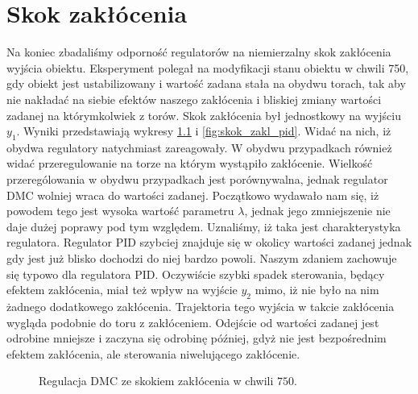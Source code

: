 \chapter{Skok zakłócenia}
Na koniec zbadaliśmy odporność regulatorów na niemierzalny skok zakłócenia
wyjścia obiektu. Eksperyment polegał na modyfikacji stanu obiektu w chwili
750, gdy obiekt jest ustabilizowany i wartość zadana stała na obydwu torach,
tak aby nie nakładać na siebie efektów naszego zakłócenia i bliskiej zmiany
wartości zadanej na którymkolwiek z torów. Skok zakłócenia był jednostkowy
na wyjściu $y_1$. Wyniki przedstawiają wykresy \ref{fig:skok_zakl_dmc} i \ref{fig:skok_zakl_pid}.
Widać na nich, iż obydwa regulatory natychmiast zareagowały. W obydwu przypadkach
również widać przeregulowanie na torze na którym wystąpiło zakłócenie. Wielkość
przerególowania w obydwu przypadkach jest porównywalna, jednak regulator DMC
wolniej wraca do wartości zadanej. Początkowo wydawało nam się, iż powodem tego
jest wysoka wartość parametru $\lambda$, jednak jego zmniejszenie nie daje dużej
poprawy pod tym względem. Uznaliśmy, iż taka jest charakterystyka regulatora.
Regulator PID szybciej znajduje się w okolicy wartości zadanej jednak gdy jest
już blisko dochodzi do niej bardzo powoli. Naszym zdaniem zachowuje się typowo
dla regulatora PID. Oczywiście szybki spadek sterowania, będący efektem zakłócenia,
miał też wpływ na wyjście $y_2$ mimo, iż nie było na nim żadnego dodatkowego zakłócenia.
Trajektoria tego wyjścia w takcie zakłócenia wygląda podobnie do toru z zakłóceniem.
Odejście od wartości zadanej jest odrobine mniejsze i zaczyna się odrobinę później, gdyż
nie jest bezpośrednim efektem zakłócenia, ale sterowania niwelującego zakłócenie.

\begin{figure}[tb]
\centering
{}
\caption{Regulacja DMC ze skokiem zakłócenia w chwili $750$.}
\label{fig:skok_zakl_dmc}
\end{figure}


